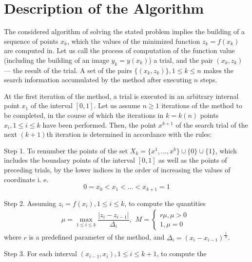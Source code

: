 \documentclass[procedia]{easychair}
\begin{document}
\section{Description of the Algorithm}
\label{sect:algorithm}

The considered algorithm of solving the stated problem implies the building of
a sequence of points \(x_k\), which the values of the minimized function \(z_k = f(x_k)\)
are computed in. Let us call the process of computation of the function value
(including the building of an image \(y_k=y(x_k)\)) a trial, and the pair \((x_k,z_k)\) ---
the result of the trial. A set of the pairs \(\{(x_k,z_k)\}, 1\leqslant k\leqslant n\)
makes the search information accumulated by the method after executing \(n\) steps.
\par
At the first iteration of the method, a trial is executed in an arbitrary internal
point \(x_1\) of the interval \([0,1]\). Let us assume \(n \geqslant 1\) iterations
of the method to be completed, in the course of which the iterations in \(k = k(n)\)
points \(x_i, 1\leqslant i\leqslant k\) have been performed. Then, the point \(x^{k+1}\)
of the search trial of the next \((k+1)\)th iteration is determined in accordance with the rules:
\par
Step 1. To renumber the points of the set \(X_k=\{x^1,\dotsc,x^k\}\cup\{0\}\cup\{1\}\),
which includes the boundary points of the interval \([0,1]\) as well as the points of
preceding trials, by the lower indices in the order of increasing the values of coordinate i. e.
\begin{displaymath}
0=x_0<x_1<\dotsc<x_{k+1}=1
\end{displaymath}
\par
Step 2. Assuming \(z_i=f(x_i),1\leqslant i\leqslant k\), to compute the quantities
\begin{equation}
\label{step2}
\mu=\max_{1\leqslant i\leqslant k}\dfrac{|z_i-z_{i-1}|}{\Delta_i},
\begin{matrix}
    M =
    \left\{
    \begin{matrix}
    r\mu,\mu>0 \\
    1,\mu=0
    \end{matrix} \right.
    \end{matrix}
\end{equation}
where \(r\) is a predefined parameter of the method, and \(\Delta_i=(x_i-x_{i-1})^\frac{1}{N}\).
\par
Step 3. For each interval \((x_{i-1},x_i),1\leqslant i\leqslant k+1\), to compute the
\end{document}
